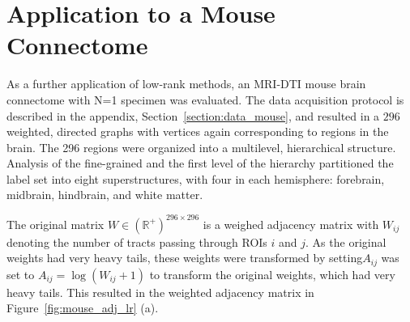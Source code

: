 \documentclass[journal,twoside,web]{ieeecolor}
\renewcommand{\Re}{\mathbb{R}}
\begin{document}
%
%





\section{Application to a Mouse Connectome}

As a further application of low-rank methods, an MRI-DTI mouse brain connectome \cite{Calabrese2015} with N=1 specimen was evaluated.
The data acquisition protocol is described in the appendix, Section~\ref{section:data_mouse}, and resulted in a $296$ weighted, directed graphs with vertices again corresponding to regions in the brain. 
The  296 regions were organized into a multilevel, hierarchical structure. Analysis of the fine-grained and the first level of the hierarchy partitioned the label set into eight superstructures, with four in each hemisphere: forebrain, midbrain, hindbrain, and white matter. 

The original matrix $W\in (\Re^+)^{296\times 296}$ is a weighed adjacency matrix with $W_{ij}$ denoting the number of tracts passing through ROIs $i$ and $j$.
As the original weights had very heavy tails, these weights were transformed by setting$A_{ij}$ was set to $A_{ij}=\log(W_{ij}+1)$ to transform the original weights, which had very heavy tails. This resulted in the weighted adjacency matrix in Figure~\ref{fig:mouse_adj_lr} (a).
\end{document}
